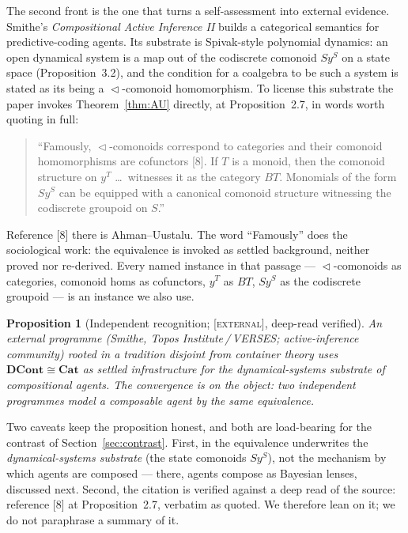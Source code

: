 \documentclass[11pt]{amsart}
\theoremstyle{plain}
\newtheorem{proposition}[theorem]{Proposition}
\theoremstyle{definition}
\newcommand{\Cat}{\mathbf{Cat}}
\newcommand{\DCont}{\mathbf{DCont}}
\newcommand{\seq}{\vartriangleleft}
\newcommand{\iso}{\cong}
\newcommand{\gExternal}{\textsc{[external]}}
\begin{document}
The second front is the one that turns a self-assessment into external evidence. Smithe's
\emph{Compositional Active Inference II} \cite{SmitheCAI2} builds a categorical semantics for
predictive-coding agents. Its substrate is Spivak-style polynomial dynamics: an open dynamical
system is a map out of the codiscrete comonoid $S y^S$ on a state space (Proposition~3.2), and
the condition for a coalgebra to be such a system is stated as its being a
$\seq$-comonoid homomorphism. To license this substrate the paper invokes Theorem~\ref{thm:AU}
directly, at Proposition~2.7, in words worth quoting in full:
\begin{quote}
``Famously, $\seq$-comonoids correspond to categories and their comonoid homomorphisms are
cofunctors [8]. If $T$ is a monoid, then the comonoid structure on $y^{T}$ \dots\ witnesses it as
the category $BT$. Monomials of the form $S y^{S}$ can be equipped with a canonical comonoid
structure witnessing the codiscrete groupoid on $S$.'' \cite[Prop.~2.7]{SmitheCAI2}
\end{quote}
Reference [8] there is Ahman--Uustalu. The word ``Famously'' does the sociological work: the
equivalence is invoked as settled background, neither proved nor re-derived. Every named instance
in that passage --- $\seq$-comonoids as categories, comonoid homs as cofunctors, $y^T$ as $BT$,
$S y^S$ as the codiscrete groupoid --- is an instance we also use.

\begin{proposition}[Independent recognition; \gExternal, deep-read verified]\label{prop:cai}
An external programme (Smithe, Topos Institute\,/\,VERSES; active-inference community) rooted in a
tradition disjoint from container theory uses $\DCont\iso\Cat$ as settled infrastructure for the
dynamical-systems substrate of compositional agents. The convergence is on the \emph{object}: two
independent programmes model a composable agent by the same equivalence.
\end{proposition}

Two caveats keep the proposition honest, and both are load-bearing for the contrast of
Section~\ref{sec:contrast}. First, in \cite{SmitheCAI2} the equivalence underwrites the
\emph{dynamical-systems substrate} (the state comonoids $S y^S$), not the mechanism by which
agents are composed --- there, agents compose as Bayesian lenses, discussed next. Second, the
citation is verified against a deep read of the source: reference [8] at Proposition~2.7,
verbatim as quoted. We therefore lean on it; we do not paraphrase a summary of it.
\end{document}
